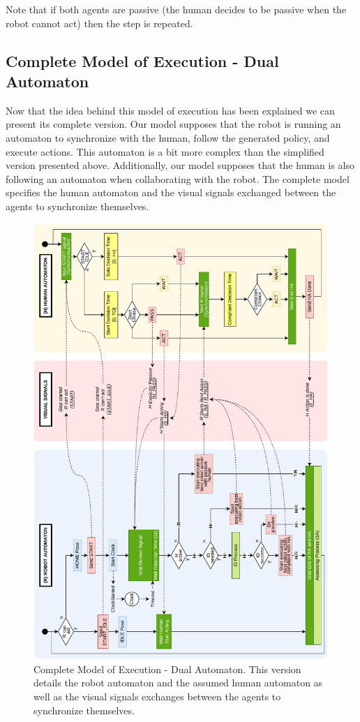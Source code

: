 Note that if both agents are passive (the human decides to be passive when the robot cannot act) then the step is repeated. 

\subsection{Complete Model of Execution - Dual Automaton}

Now that the idea behind this model of execution has been explained we can present its complete version. Our model supposes that the robot is running an automaton to synchronize with the human, follow the generated policy, and execute actions. This automaton is a bit more complex than the simplified version presented above. Additionally, our model supposes that the human is also following an automaton when collaborating with the robot. The complete model specifies the human automaton and the visual signals exchanged between the agents to synchronize themselves.


\begin{figure}
    \centering
    \includegraphics[width=0.99\linewidth]{images/Chapter4/new_complete_automaton_rotated.pdf}
    \caption{Complete Model of Execution - Dual Automaton. This version details the robot automaton and the assumed human automaton as well as the visual signals exchanges between the agents to synchronize themselves.}
\end{figure}

